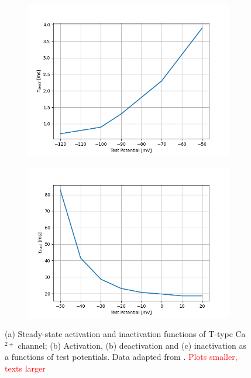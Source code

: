 \documentclass[../main.tex]{subfiles}
\begin{document}
\begin{figure}[!t]
    \begin{subfigure}[t]{0.45\textwidth}
        \centering
        \includegraphics[width=\textwidth]{../../reports/workflow/img/t_type_calcium_channel/2_1_tau_r_jeong.png}
        \caption{}
    \end{subfigure}
    \hfill
    \begin{subfigure}[t]{0.45\textwidth}
        \centering
        \includegraphics[width=\textwidth]{../../reports/workflow/img/t_type_calcium_channel/2_1_tau_h_jeong.png}
        \caption{}
    \end{subfigure}
    
    \caption{
        (a) Steady-state activation and inactivation functions of T-type Ca$^{2+}$ channel;
        (b) Activation, (b) deactivation and (c) inactivation as a functions of test potentials.
        Data adapted from \parencite{jeongCaa1TFlyTtype2015}. \textcolor{red}{Plots smaller, texts larger}
    }
    \label{fig:data_from_jeong}
\end{figure}
\end{document}
